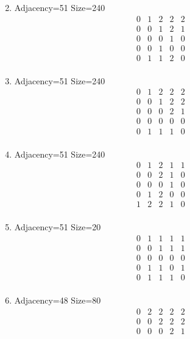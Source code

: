 \documentclass[12pt]{article}
\begin{document}
\begin{multicols}{3}
\begin{enumerate}
\begin{equation*}
\end{equation*}
\item Adjacency=51 Size=240
\begin{equation*}
\begin{array}{ccccc}
0&1&2&2&2\\
0&0&1&2&1\\
0&0&0&1&0\\
0&0&1&0&0\\
0&1&1&2&0\\
\end{array}
\end{equation*}
\item Adjacency=51 Size=240
\begin{equation*}
\begin{array}{ccccc}
0&1&2&2&2\\
0&0&1&2&2\\
0&0&0&2&1\\
0&0&0&0&0\\
0&1&1&1&0\\
\end{array}
\end{equation*}
\item Adjacency=51 Size=240
\begin{equation*}
\begin{array}{ccccc}
0&1&2&1&1\\
0&0&2&1&0\\
0&0&0&1&0\\
0&1&2&0&0\\
1&2&2&1&0\\
\end{array}
\end{equation*}
\item Adjacency=51 Size=20
\begin{equation*}
\begin{array}{ccccc}
0&1&1&1&1\\
0&0&1&1&1\\
0&0&0&0&0\\
0&1&1&0&1\\
0&1&1&1&0\\
\end{array}
\end{equation*}
\item Adjacency=48 Size=80
\begin{equation*}
\begin{array}{ccccc}
0&2&2&2&2\\
0&0&2&2&2\\
0&0&0&2&1\\

\end{array}
\end{equation*}
\end{enumerate}
\end{multicols}
\end{document}
